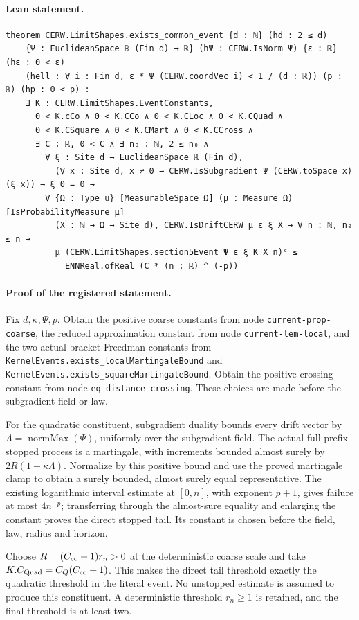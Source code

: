 \paragraph{Lean statement.}
\begin{verbatim}
theorem CERW.LimitShapes.exists_common_event {d : ℕ} (hd : 2 ≤ d)
    {Ψ : EuclideanSpace ℝ (Fin d) → ℝ} (hΨ : CERW.IsNorm Ψ) {ε : ℝ} (hε : 0 < ε)
    (hell : ∀ i : Fin d, ε * Ψ (CERW.coordVec i) < 1 / (d : ℝ)) (p : ℝ) (hp : 0 < p) :
    ∃ K : CERW.LimitShapes.EventConstants,
      0 < K.cCo ∧ 0 < K.CCo ∧ 0 < K.CLoc ∧ 0 < K.CQuad ∧
      0 < K.CSquare ∧ 0 < K.CMart ∧ 0 < K.CCross ∧
      ∃ C : ℝ, 0 < C ∧ ∃ n₀ : ℕ, 2 ≤ n₀ ∧
        ∀ ξ : Site d → EuclideanSpace ℝ (Fin d),
          (∀ x : Site d, x ≠ 0 → CERW.IsSubgradient Ψ (CERW.toSpace x) (ξ x)) → ξ 0 = 0 →
        ∀ {Ω : Type u} [MeasurableSpace Ω] (μ : Measure Ω) [IsProbabilityMeasure μ]
          (X : ℕ → Ω → Site d), CERW.IsDriftCERW μ ε ξ X → ∀ n : ℕ, n₀ ≤ n →
          μ (CERW.LimitShapes.section5Event Ψ ε ξ K X n)ᶜ ≤
            ENNReal.ofReal (C * (n : ℝ) ^ (-p))
\end{verbatim}
\paragraph{Proof of the registered statement.}
Fix $d,\kappa,\Psi,p$. Obtain the positive coarse constants from node
\texttt{current-prop-coarse}, the reduced approximation constant from node
\texttt{current-lem-local}, and the two actual-bracket Freedman constants from
\texttt{KernelEvents.exists\_localMartingaleBound} and
\texttt{KernelEvents.exists\_squareMartingaleBound}. Obtain the positive
crossing constant from node \texttt{eq-distance-crossing}. These choices
are made before the subgradient field or law.

For the quadratic constituent, subgradient duality bounds every drift vector by
$\Lambda=\operatorname{normMax}(\Psi)$, uniformly over the subgradient field.
The actual full-prefix stopped process is a martingale, with increments bounded
almost surely by $2R(1+\kappa\Lambda)$. Normalize by this positive bound and use
the proved martingale clamp to obtain a surely bounded, almost surely equal
representative. The existing logarithmic interval estimate at $[0,n]$, with
exponent $p+1$, gives failure at most $4n^{-p}$; transferring through the
almost-sure equality and enlarging the constant proves the direct stopped tail.
Its constant is chosen before the field, law, radius and horizon.

Choose $R=(C_{\rm co}+1)r_n>0$ at the deterministic coarse scale and take
$K.C_{\rm Quad}=C_Q(C_{\rm co}+1)$. This makes the direct tail threshold
exactly the quadratic threshold in the literal event. No unstopped estimate
is assumed to produce this constituent. A deterministic threshold $r_n\geq1$
is retained, and the final threshold is at least two.

